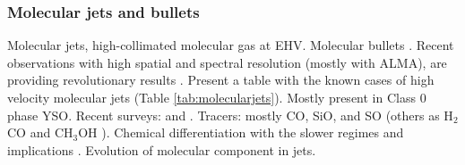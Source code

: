 \documentclass[12pt]{mythesis}
\begin{document}
\subsubsection{Molecular jets and bullets}\label{sec:molecularjets}

Molecular jets, high-collimated molecular gas at EHV.
Molecular bullets \citep{bachiller1990, bachiller1996}. Recent observations with high spatial and spectral resolution (mostly with ALMA), are providing revolutionary results \citep{lee2020}. 
Present a table with the known cases of high velocity molecular jets (Table \ref{tab:molecularjets}). 
Mostly present in Class 0 phase YSO.
Recent surveys: \citet{podio2021} and \citet{dutta2023}. Tracers: mostly CO, SiO, and SO (others as H$_2$CO and CH$_3$OH \citep{tafalla2010}).
Chemical differentiation with the slower regimes and implications \citep{tafalla2010}.
Evolution of molecular component in jets.
\end{document}
